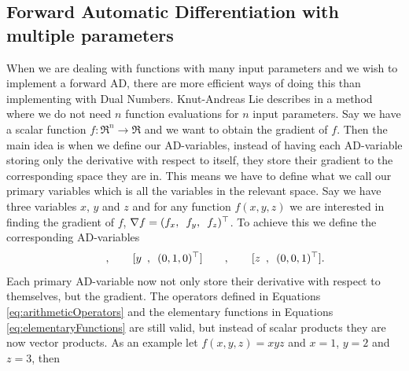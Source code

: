 \subsection{Forward Automatic Differentiation with multiple parameters}
When we are dealing with functions with many input parameters and we wish to implement a forward AD, there are more efficient ways of doing this than implementing with Dual Numbers. Knut-Andreas Lie describes in \emph{\citet{lieMrstUrl}} a method where we do not need $n$ function evaluations for $n$ input parameters. Say we have a scalar function $f: \Re^n \rightarrow \Re$ and we want to obtain the gradient of $f$. Then the main idea is when we define our AD-variables, instead of having each AD-variable storing only the derivative with respect to itself, they store their gradient to the corresponding space they are in. This means we have to define what we call our primary variables which is all the variables in the relevant space. Say we have three variables $x$, $y$ and $z$ and for any function $f(x,y,z)$ we are interested in finding the gradient of $f$, $\nabla f=(f_x,\hspace{0.5em} f_y,\hspace{0.5em} f_z)^\top$. To achieve this we define the corresponding AD-variables
\begin{equation*}
    [x\hspace{0.5em},\hspace{0.5em}(1,0,0)^\top]\hspace{2em},\hspace{2em}
    [y\hspace{0.5em},\hspace{0.5em}(0,1,0)^\top]\hspace{2em},\hspace{2em}
    [z\hspace{0.5em},\hspace{0.5em}(0,0,1)^\top].
\end{equation*}
Each primary AD-variable now not only store their derivative with respect to themselves, but the gradient. The operators defined in Equations \ref{eq:arithmeticOperators} and the elementary functions in Equations \ref{eq:elementaryFunctions} are still valid, but instead of scalar products they are now vector products. As an example let $f(x,y,z) = xyz$ and $x = 1$, $y = 2$ and $z = 3$, then
